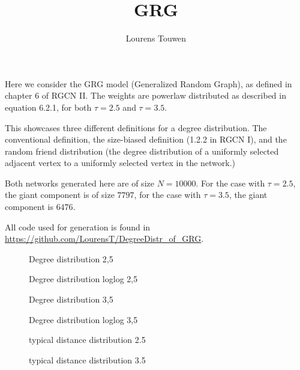 \documentclass[fleqn]{article}
\title{GRG}
\author{Lourens Touwen}
\begin{document}
	
	\pagestyle{plain}
	
	\maketitle
	
	\newlength\fheight 
	\newlength\fwidth 
	\setlength{} 
	\setlength{}
	
	
	Here we consider the GRG model (Generalized Random Graph), as defined in chapter 6 of RGCN II. The weights are powerlaw distributed as described in equation 6.2.1, for both $\tau = 2.5$ and $\tau = 3.5$.

	This showcases three different definitions for a degree distribution. The conventional definition, the size-biased definition (1.2.2 in RGCN I), and the random friend distribution (the degree distribution of a uniformly selected adjacent vertex to a uniformly selected vertex in the network.)
	
	Both networks generated here are of size $N = 10000.$ For the case with $\tau = 2.5$, the giant component is of size $7797$, for the case with $\tau = 3.5$, the giant component is $6476$.
	
	All code used for generation is found in \url{https://github.com/LourensT/DegreeDistr_of_GRG}.
	
	
	\begin{figure}[!htb]
		\centering
		
		\caption{Degree distribution 2,5}
	\end{figure}

	\begin{figure}[!htb]
		\centering
		
		\caption{Degree distribution loglog 2,5}
	\end{figure}

	\begin{figure}[!htb]
		\centering
		
		\caption{Degree distribution 3,5}
	\end{figure}
	
	\begin{figure}[!htb]
		\centering
		
		\caption{Degree distribution loglog 3,5}
	\end{figure}
	
	
	\begin{figure}[!htb]
		\centering
		
		\caption{typical distance distribution 2.5}
	\end{figure}

	\begin{figure}[!htb]
		\centering
		
		\caption{typical distance distribution 3.5}
	\end{figure}
\end{document}

